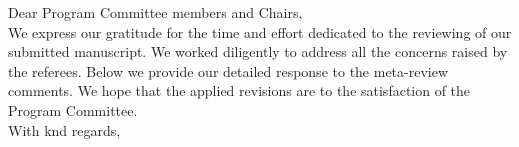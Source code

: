 Dear Program Committee members and Chairs,%
\\[2em]
We express our gratitude for the time and effort dedicated to the reviewing of our submitted manuscript. We worked diligently to address all the concerns raised by the referees. Below we provide our detailed response to the meta-review comments.
We hope that the applied revisions are to the satisfaction of the Program Committee.
\\[2em]
With knd regards,
\begin{flushright}
\AuthorsInSignature
\end{flushright}

